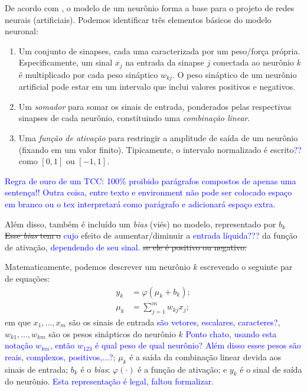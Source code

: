 \documentclass{automatextcc}
\newcommand{\pumi}[1]{\textcolor{blue}{#1}}
\begin{document}
De acordo com \citet{haykin2001redesneurais}, o modelo de um neurônio forma a base para o projeto de redes neurais (artificiais). Podemos identificar três elementos básicos do modelo neuronal:

\begin{enumerate}
    \item Um conjunto de sinapses, cada uma caracterizada por um peso/força própria. Especificamente, um sinal $x_j$ na entrada da sinapse $j$ conectada ao neurônio $k$ é multiplicado por cada peso sináptico $w_{kj}$. O peso sináptico de um neurônio artificial pode estar em um intervalo que inclui valores positivos e negativos.
    \item Um \textit{somador} para somar os sinais de entrada, ponderados pelas respectivas sinapses de cada neurônio, constituindo uma \textit{combinação linear}.
    \item Uma \textit{função de ativação} para restringir a amplitude de saída de um neurônio (fixando em um valor finito). Tipicamente, o intervalo normalizado é escrito\pumi{??} como $[0,1]$ ou $[-1,1]$.
\end{enumerate}

\pumi{Regra de ouro de um TCC: 100\% proibido parágrafos compostos de apenas uma sentença!! Outra coisa, entre texto e environment não pode ser colocado espaço em branco ou o tex interpretará como parágrafo e adicionará espaço extra.}

Além disso, também é incluído um \textit{bias} (viés) no modelo, representado por $b_k$ \sout{ Esse \textit{bias} tem o} \pumi{cujo} efeito de aumentar/diminuir a \pumi{entrada líquida???} da função de ativação, \pumi{dependendo de seu sinal.} \sout{se ele é positivo ou negativo.}

Matematicamente, podemos descrever um neurônio $k$ escrevendo o seguinte par de equações:
\begin{align*}
y_k &= \varphi(\mu_k + b_k);\\[.2cm]
\mu_k &= \displaystyle{\sum_{j=1}^{m} }w_{kj}x_j;
\end{align*}
em que $x_1,\dots,x_m$ são os sinais de entrada \pumi{são vetores, escalares, caracteres?}, $w_{k1},\dots,w_{km}$ são os pesos sinápticos do neurônio $k$ \pumi{Ponto chato, usando esta notação $w_{km}$, então $w_{123}$ é qual peso de qual neurônio? Além disso esses pesos são reais, complexos, positivos,$\ldots$?}; $\mu_k$ é a saída da combinação linear devida aos sinais de entrada; $b_k$ é o \textit{bias}; $\varphi(\cdot)$ é a função de ativação; e $y_k$ é o sinal de saída do neurônio. \pumi{Esta representação é legal, faltou formalizar.}
\end{document}
